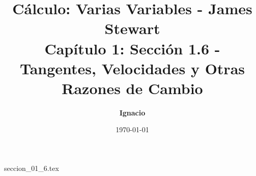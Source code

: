 \documentclass[11pt,spanish,oneside]{report}
\title{\textbf{Cálculo: Varias Variables - James Stewart} \\ \Large Capítulo 1: Sección 1.6 - Tangentes, Velocidades y Otras Razones de Cambio}
\author{\textbf{Ignacio}}
\date{\today}
\begin{document}
\maketitle

{seccion_01_6.tex}
\end{document}
